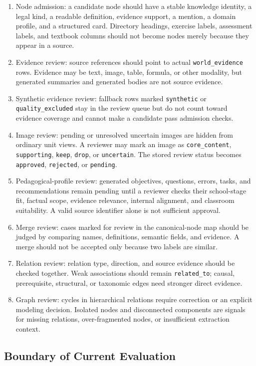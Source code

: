 \documentclass[11pt,letterpaper]{article}
\newcommand{\code}[1]{\nolinkurl{#1}}
\begin{document}
\begin{enumerate}
  \item Node admission: a candidate node should have a stable knowledge identity, a legal kind, a readable definition, evidence support, a mention, a domain profile, and a structured card. Directory headings, exercise labels, assessment labels, and textbook columns should not become nodes merely because they appear in a source.
  \item Evidence review: source references should point to actual \code{world_evidence} rows. Evidence may be text, image, table, formula, or other modality, but generated summaries and generated bodies are not source evidence.
  \item Synthetic evidence review: fallback rows marked \code{synthetic} or \code{quality_excluded} stay in the review queue but do not count toward evidence coverage and cannot make a candidate pass admission checks.
  \item Image review: pending or unresolved uncertain images are hidden from ordinary unit views. A reviewer may mark an image as \code{core_content}, \code{supporting}, \code{keep}, \code{drop}, or \code{uncertain}. The stored review status becomes \code{approved}, \code{rejected}, or \code{pending}.
  \item Pedagogical-profile review: generated objectives, questions, errors, tasks, and recommendations remain pending until a reviewer checks their school-stage fit, factual scope, evidence relevance, internal alignment, and classroom suitability. A valid source identifier alone is not sufficient approval.
  \item Merge review: cases marked for review in the canonical-node map should be judged by comparing names, definitions, semantic fields, and evidence. A merge should not be accepted only because two labels are similar.
  \item Relation review: relation type, direction, and source evidence should be checked together. Weak associations should remain \code{related_to}; causal, prerequisite, structural, or taxonomic edges need stronger direct evidence.
  \item Graph review: cycles in hierarchical relations require correction or an explicit modeling decision. Isolated nodes and disconnected components are signals for missing relations, over-fragmented nodes, or insufficient extraction context.
\end{enumerate}

\subsection{Boundary of Current Evaluation}
\end{document}
